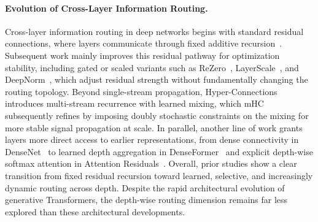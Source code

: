 \documentclass[]{ant_tech_report}
\begin{document}
\paragraph{Evolution of Cross-Layer Information Routing.} Cross-layer information routing in deep networks begins with standard residual connections, where layers communicate through fixed additive recursion~\citep{he2016deep,srivastava2015highway}. Subsequent work mainly improves this residual pathway for optimization stability, including gated or scaled variants such as ReZero~\citep{bachlechner2021rezero}, LayerScale~\citep{touvron2021going}, and DeepNorm~\citep{wang2024deepnet}, which adjust residual strength without fundamentally changing the routing topology. Beyond single-stream propagation, Hyper-Connections~\citep{zhu2024hyper} introduces multi-stream recurrence with learned mixing, which mHC~\citep{xie2025mhc} subsequently refines by imposing doubly stochastic constraints on the mixing for more stable signal propagation at scale. In parallel, another line of work grants layers more direct access to earlier representations, from dense connectivity in DenseNet~\citep{huang2017densely} to learned depth aggregation in DenseFormer~\citep{pagliardini2024denseformer} and explicit depth-wise softmax attention in Attention Residuals~\citep{team2026attention}. Overall, prior studies show a clear transition from fixed residual recursion toward learned, selective, and increasingly dynamic routing across depth. Despite the rapid architectural evolution of generative Transformers, the depth-wise routing dimension remains far less explored than these architectural developments.
\end{document}
